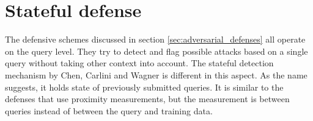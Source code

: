 %


\section{Stateful defense}\label{sec:stateful_detection}
The defensive schemes discussed in section \ref{sec:adversarial_defenses} all operate on the query level. They try to detect and flag possible attacks based on a single query without taking other context into account. The stateful detection mechanism by Chen, Carlini and Wagner \cite{chen_stateful_2019} is different in this aspect. As the name suggests, it holds state of previously submitted queries. It is similar to the defenses that use proximity measurements, but the measurement is between queries instead of between the query and training data.\\

